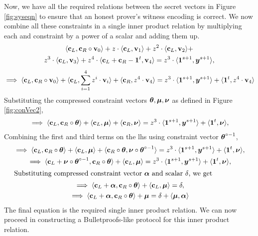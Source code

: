 \noindent
Now, we have all the required relations between the secret vectors in Figure \ref{fig:syseqn} to ensure that an honest prover's witness encoding is correct.
We now combine all these constraints in a single inner product relation by multiplying each and constraint by a power of a scalar and adding them up.
\begin{multline*}
  \langle \textbf{c}_L, \textbf{c}_R  \circ \textbf{v}_0 \rangle + 
  z \cdot \langle \textbf{c}_L , \textbf{v}_{1} \rangle +
  z^2 \cdot \langle \textbf{c}_L, \textbf{v}_2 \rangle + \\
  z^3 \cdot \langle \textbf{c}_L, \textbf{v}_3 \rangle  +
  z^4 \cdot \langle \textbf{c}_L + \textbf{c}_R - {\boldsymbol{1}}^{t}, \textbf{v}_{4} \rangle 
  = z^3 \cdot \langle {\boldsymbol{1}}^{s+1}, {\boldsymbol{y}}^{s+1} \rangle,
\end{multline*}
\begin{gather*}
  \implies
  \langle \textbf{c}_L, \textbf{c}_R  \circ \textbf{v}_0 \rangle + \langle \textbf{c}_L , \sum_{i=1}^{4} z^i \cdot \textbf{v}_{i} \rangle 
  + \langle \textbf{c}_R, z^4 \cdot \textbf{v}_{4} \rangle
  =
  z^3 \cdot \langle {\boldsymbol{1}}^{s+1}, {\boldsymbol{y}}^{s+1} \rangle
  + \langle {\boldsymbol{1}}^{t}, z^4 \cdot \textbf{v}_{4} \rangle
\end{gather*}
Substituting the compressed constraint vectors ${\boldsymbol{\theta}}, {\boldsymbol{\mu}}, {\boldsymbol{\nu}}$ as defined in Figure \ref{fig:conVec2}, 
\begin{gather*}
  \implies
  \langle \textbf{c}_L, \textbf{c}_R  \circ {\boldsymbol{\theta}} \rangle + \langle \textbf{c}_L , {\boldsymbol{\mu}} \rangle 
  + \langle \textbf{c}_R, {\boldsymbol{\nu}} \rangle
  =
  z^3 \cdot \langle {\boldsymbol{1}}^{s+1}, {\boldsymbol{y}}^{s+1} \rangle
  + \langle {\boldsymbol{1}}^{t}, {\boldsymbol{\nu}} \rangle,
\end{gather*}
Combining the first and third terms on the lhs using constraint vector ${\boldsymbol{\theta}}^{\circ -1}$,
\begin{gather*}
  \implies
  \langle \textbf{c}_L, \textbf{c}_R  \circ {\boldsymbol{\theta}} \rangle + \langle \textbf{c}_L , {\boldsymbol{\mu}} \rangle 
  + \langle \textbf{c}_R \circ {\boldsymbol{\theta}}, {\boldsymbol{\nu}} \circ {\boldsymbol{\theta}}^{\circ -1} \rangle
  =
  z^3 \cdot \langle {\boldsymbol{1}}^{s+1}, {\boldsymbol{y}}^{s+1} \rangle
  + \langle {\boldsymbol{1}}^{t}, {\boldsymbol{\nu}} \rangle,\\
  \implies
  \langle \textbf{c}_L + {\boldsymbol{\nu}} \circ {\boldsymbol{\theta}}^{\circ -1}, \textbf{c}_R  \circ {\boldsymbol{\theta}} \rangle 
  + \langle \textbf{c}_L , {\boldsymbol{\mu}} \rangle 
  =
  z^3 \cdot \langle {\boldsymbol{1}}^{s+1}, {\boldsymbol{y}}^{s+1} \rangle
  + \langle {\boldsymbol{1}}^{t}, {\boldsymbol{\nu}} \rangle,\\
  \intertext{Substituting compressed constraint vector ${\boldsymbol{\alpha}}$ and scalar $\delta$, we get}
  \implies
  \langle \textbf{c}_L + {\boldsymbol{\alpha}}, \textbf{c}_R  \circ {\boldsymbol{\theta}} \rangle 
  + \langle \textbf{c}_L , {\boldsymbol{\mu}} \rangle 
  =
  \delta,\\
  \implies
  \langle \textbf{c}_L + {\boldsymbol{\alpha}}, \textbf{c}_R  \circ {\boldsymbol{\theta}} \rangle + {\boldsymbol{\mu}}
  =
  \delta + \langle {\boldsymbol{\mu}}, {\boldsymbol{\alpha}} \rangle
\end{gather*}
The final equation is the required single inner product relation.
We can now proceed in constructing a Bulletproofs-like protocol for this inner product relation.  

